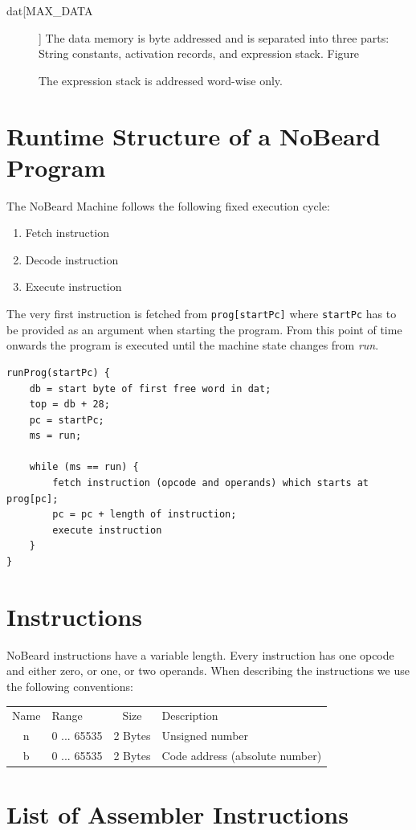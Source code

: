 \documentclass[11pt]{report}
\newcommand{\leongage}{NoBeard}
\begin{document}
\begin{description}
	\item[dat[MAX\_DATA]] The data memory is byte addressed and is separated into three parts: String constants,
	activation records, and expression stack. Figure
	
	The expression stack is addressed word-wise only.
\end{description}

\section{Runtime Structure of a \leongage{} Program}
The \leongage{} Machine follows the following fixed execution cycle:
\begin{enumerate}
	\item Fetch instruction
	\item Decode instruction
	\item Execute instruction
\end{enumerate}
The very first instruction is fetched from {\tt prog[startPc]} where {\tt startPc} has to be provided as an argument when starting the program. From this point of time onwards the program is executed until the machine state changes from {\em run}.

\lstset{language=Java, tabsize=2, basicstyle=\small}
\begin{lstlisting}
runProg(startPc) {
	db = start byte of first free word in dat;
	top = db + 28;
	pc = startPc;
	ms = run;
	
	while (ms == run) {
		fetch instruction (opcode and operands) which starts at prog[pc];
		pc = pc + length of instruction;
		execute instruction
	}
}
\end{lstlisting}

\section{Instructions}
\leongage{} instructions have a variable length. Every instruction has one opcode and either zero, or one, or two operands. When describing the instructions we use the following conventions:

\begin{tabular}{clcl}
Name & Range & Size & Description \\
n & 0 ... 65535 & 2 Bytes & Unsigned number \\
b & 0 ... 65535 & 2 Bytes & Code address (absolute number)
\end{tabular}
\section{List of Assembler Instructions}
\lstset{language=[x86masm]Assembler, tabsize=2, basicstyle=\footnotesize}
\end{document}
